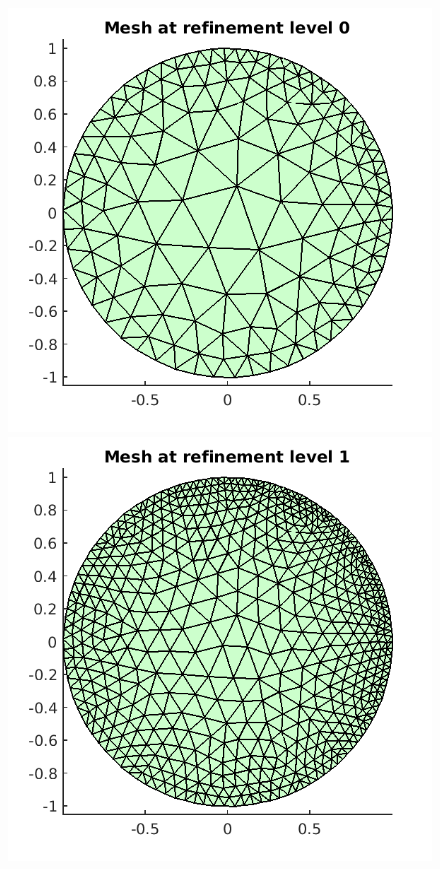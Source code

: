 \documentclass{article}
\begin{document}
\begin{figure}[!ht]
\centering
\includegraphics[scale=0.5]{um_1.png}
\includegraphics[scale=0.5]{um_2.png}

\end{figure}
\end{document}
